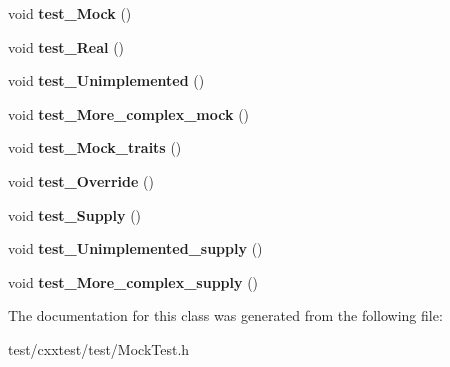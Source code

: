 \begin{DoxyCompactItemize}
\item 
\hypertarget{classMockTest_aaa8ae65b90b1235251d3ff67f6dcb805}{void {\bfseries test\-\_\-\-Mock} ()}\label{classMockTest_aaa8ae65b90b1235251d3ff67f6dcb805}

\item 
\hypertarget{classMockTest_a974191fe7b32822a39d3fc75ca9f05cc}{void {\bfseries test\-\_\-\-Real} ()}\label{classMockTest_a974191fe7b32822a39d3fc75ca9f05cc}

\item 
\hypertarget{classMockTest_a36d56f64d188ecc60ba4a2b47487d8aa}{void {\bfseries test\-\_\-\-Unimplemented} ()}\label{classMockTest_a36d56f64d188ecc60ba4a2b47487d8aa}

\item 
\hypertarget{classMockTest_ae70268954817b3c7dfe77a808dad48cb}{void {\bfseries test\-\_\-\-More\-\_\-complex\-\_\-mock} ()}\label{classMockTest_ae70268954817b3c7dfe77a808dad48cb}

\item 
\hypertarget{classMockTest_a7bc944db60c457fa1a3fe2bba66c1a57}{void {\bfseries test\-\_\-\-Mock\-\_\-traits} ()}\label{classMockTest_a7bc944db60c457fa1a3fe2bba66c1a57}

\item 
\hypertarget{classMockTest_a82d442e3e5217f8a187fb71bcf77c6e6}{void {\bfseries test\-\_\-\-Override} ()}\label{classMockTest_a82d442e3e5217f8a187fb71bcf77c6e6}

\item 
\hypertarget{classMockTest_a4de763a97c4f6409acdb5ff999958b0f}{void {\bfseries test\-\_\-\-Supply} ()}\label{classMockTest_a4de763a97c4f6409acdb5ff999958b0f}

\item 
\hypertarget{classMockTest_a7970f3445c36d9cb14921596a9038359}{void {\bfseries test\-\_\-\-Unimplemented\-\_\-supply} ()}\label{classMockTest_a7970f3445c36d9cb14921596a9038359}

\item 
\hypertarget{classMockTest_a30f9995d3005a61031faf9a350d2404e}{void {\bfseries test\-\_\-\-More\-\_\-complex\-\_\-supply} ()}\label{classMockTest_a30f9995d3005a61031faf9a350d2404e}

\end{DoxyCompactItemize}


The documentation for this class was generated from the following file\-:\begin{DoxyCompactItemize}
\item 
test/cxxtest/test/Mock\-Test.\-h\end{DoxyCompactItemize}
